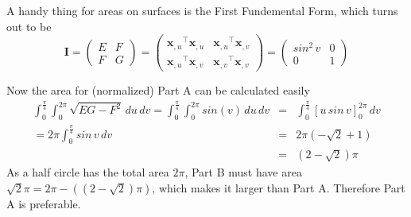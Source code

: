 \documentclass{scrartcl}
\begin{document}
A handy thing for areas on surfaces is the First Fundemental Form, which turns out to be
\begin{equation}
	\mathbf{I} =
	\begin{pmatrix}
		E & F\\
		F & G
	\end{pmatrix}
	=
	\begin{pmatrix}
		{\mathbf{x}_{,u}}^\top{\mathbf{x}_{,u}} & {\mathbf{x}_{,u}}^\top{\mathbf{x}_{,v}}\\
		{\mathbf{x}_{,u}}^\top{\mathbf{x}_{,v}} & {\mathbf{x}_{,v}}^\top{\mathbf{x}_{,v}}
	\end{pmatrix}
	=
	\begin{pmatrix}
		sin^2\,v & 0\\
		0 & 1
	\end{pmatrix}
\end{equation}

Now the area for (normalized) Part A can be calculated easily
\begin{eqnarray}
	\int_0^{\frac{\pi}{4}}\int_0^{2\pi} \sqrt{EG-F^2} \, du \, dv 
	=
	\int_0^{\frac{\pi}{4}}\int_0^{2\pi} sin(v) \, du \, dv
	&=&
	\int_0^{\frac{\pi}{4}}[u\,sin\,v]_0^{2\pi} \, dv \\
	=
	2\pi\int_0^{\frac{\pi}{4}}sin\,v\,dv
	&=&
	2\pi(-\sqrt{2}+1)\\
	&=&
	(2-\sqrt{2})\pi
\end{eqnarray}
As a half circle has the total area $2\pi$, Part B must have area 
$\sqrt{2}\pi=2\pi-((2-\sqrt{2})\pi)$, which makes it larger than Part A.
Therefore Part A is preferable.

	
\end{document}
